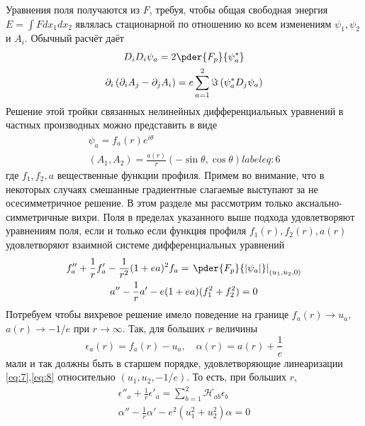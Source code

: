 Уравнения поля получаются из \( F \), требуя, чтобы общая свободная энергия 
\( E = \int F dx_1 dx_2 \) являлась стационарной по отношению ко всем 
изменениям \( \psi_1, \psi_2 \) и \( A_i \). Обычный расчёт даёт 
\begin{gather}
    D_i D_i \psi_a = 2\pder{F_p}{\psi_a^{*}}
    \label{eq:4} \\
    \partial_i \left( \partial_i A_j - \partial_j A_i \right) = 
        e\sum\limits_{a=1}^{2}\Im\left( \psi_a^* D_j \psi_a \right)
    \label{eq:5}
\end{gather}
Решение этой тройки связанных нелинейных дифференциальных уравнений в частных 
производных можно представить в виде
\begin{gather}
    \psi_a = f_a(r)e^{i\theta} \nonumber \\
    (A_1, A_2) = \frac{a(r)}{r}(-\sin\theta, \cos\theta)
    label{eq:6}
\end{gather}
где \( f_1, f_2, a \) вещественные функции профиля. Примем во внимание, что 
в некоторых случаях смешанные градиентные слагаемые выступают за не 
осесимметричное решение. В этом разделе мы рассмотрим только 
аксиально-симметричные вихри. Поля в пределах указанного выше подхода 
удовлетворяют уравнениям поля, если и только если функция профиля 
\( f_1(r), f_2(r), a(r) \) удовлетворяют взаимной системе дифференциальных 
уравнений
\begin{gather}
    f''_a + \frac{1}{r} f'_a - \frac{1}{r^2}(1+ea)^2 f_a = 
        \left. \pder{F_p}{|\psi_a|} \right|_{(u_1, u_2, 0)}
    \label{eq:7} \\
    a'' - \frac{1}{r} a' - e(1+ea)(f_1^2+f_2^2) = 0
    \label{eq:8}
\end{gather}
Потребуем чтобы вихревое решение имело поведение на границе
\( f_a(r) \rightarrow u_a \), \( a(r) \rightarrow -1/e \) при
\( r \rightarrow \infty \). Так, для больших \( r \) величины
\begin{equation}
    \epsilon_a(r) = f_a(r) - u_a, \quad
    \alpha(r) = a(r) + \frac{1}{e}
    \label{eq:9}
\end{equation}
мали и так должны быть в старшем порядке, удовлетворяющие линеаризации 
\eqref{eq:7},\eqref{eq:8} относительно \( (u_1, u_2, -1/e) \). То есть, при 
больших \( r \),
\begin{gather}
    \epsilon''_a + \frac{1}{r} \epsilon'_a = \sum\limits_{b=1}^{2}
        \mathcal{H}_{ab} \epsilon_b
    \label{eq:10} \\
    \alpha'' - \frac{1}{r} \alpha' - e^2(u_1^2 + u_2^2 )\alpha = 0
    \label{eq:11}
\end{gather}
